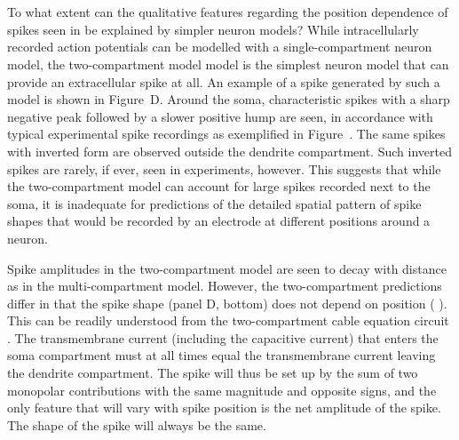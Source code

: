 \section{}
\label{sec:Spikes:two-compartment}
To what extent can the qualitative features regarding the position dependence of spikes seen 
in  be explained by simpler neuron models? 
While intracellularly recorded action potentials can be modelled with a single-compartment neuron model, 
the two-compartment model model is the simplest neuron model that can provide an extracellular spike at all. 
An example of a spike generated by such a model is shown in Figure~D. Around the soma, characteristic spikes with a sharp negative peak followed by a slower positive hump are seen, in accordance with typical experimental spike recordings as exemplified in Figure~. The same spikes with inverted form are observed outside the dendrite compartment. Such inverted spikes are rarely, if ever, seen in experiments, however. This suggests that while the two-compartment model can account for large spikes recorded next to the soma, it is inadequate for 
predictions of  the detailed spatial pattern of spike shapes that would be recorded by an electrode at different positions around a neuron.   

Spike amplitudes in the two-compartment model are seen to decay with distance as in the multi-compartment model. However, the two-compartment predictions differ in that the spike shape (panel D, bottom) does not depend on position ( ). This can be readily understood from the two-compartment cable equation circuit .  The transmembrane current (including the capacitive current) that enters the soma compartment must at all times equal the transmembrane current leaving the dendrite compartment. The spike will thus be set up by the sum of two monopolar contributions with the same magnitude and opposite signs, and the only feature that will vary with spike position is the net amplitude of the spike. The shape of the spike will always be the same. 

